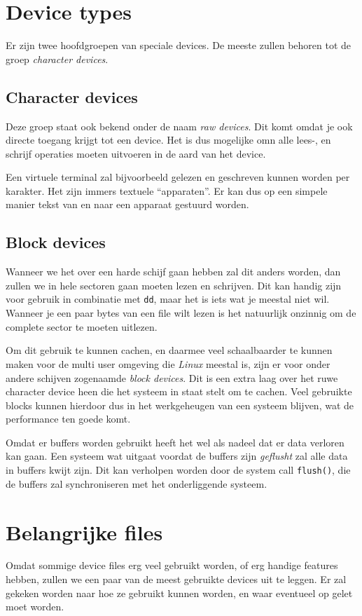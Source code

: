 \section{Device types}
Er zijn twee hoofdgroepen van speciale devices. De meeste zullen behoren tot de groep \emph{character devices}. 

\subsection{Character devices}
Deze groep staat ook bekend onder de naam \emph{raw devices}. Dit komt omdat je ook directe toegang krijgt tot een device. Het is dus mogelijke omn alle lees-, en schrijf operaties moeten uitvoeren in de aard van het device. 

Een virtuele terminal zal bijvoorbeeld gelezen en geschreven kunnen worden per karakter. Het zijn immers textuele ``apparaten''. Er kan dus op een simpele manier tekst van en naar een apparaat gestuurd worden. 

\subsection{Block devices}
Wanneer we het over een harde schijf gaan hebben zal dit anders worden, dan zullen we in hele sectoren gaan moeten lezen en schrijven. Dit kan handig zijn voor gebruik in combinatie met \texttt{dd}, maar het is iets wat je meestal niet wil. Wanneer je een paar bytes van een file wilt lezen is het natuurlijk onzinnig om de complete sector te moeten uitlezen. 

Om dit gebruik te kunnen cachen, en daarmee veel schaalbaarder te kunnen maken voor de multi user omgeving die \emph{Linux} meestal is, zijn er voor onder andere schijven zogenaamde \emph{block devices}. Dit is een extra laag over het ruwe character device heen die het systeem in staat stelt om te cachen. Veel gebruikte blocks kunnen hierdoor dus in het werkgeheugen van een systeem blijven, wat de performance ten goede komt. 

Omdat er buffers worden gebruikt heeft het wel als nadeel dat er data verloren kan gaan. Een systeem wat uitgaat voordat de buffers zijn \emph{geflusht} zal alle data in buffers kwijt zijn. Dit kan verholpen worden door de system call \texttt{flush()}, die de buffers zal synchroniseren met het onderliggende systeem. 

\section{Belangrijke files}
Omdat sommige device files erg veel gebruikt worden, of erg handige features hebben, zullen we een paar van de meest gebruikte devices uit te leggen. Er zal gekeken worden naar hoe ze gebruikt kunnen worden, en waar eventueel op gelet moet worden. 

